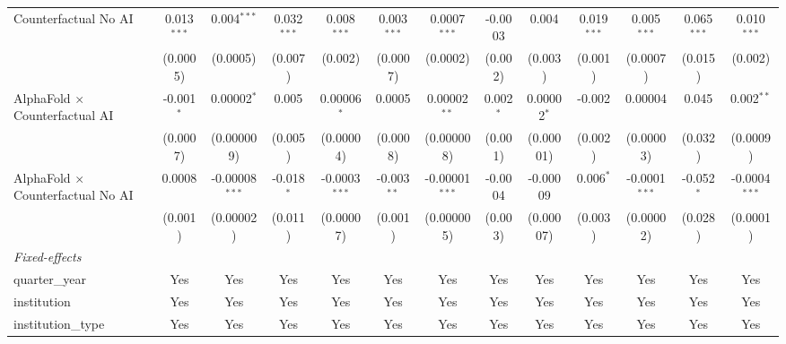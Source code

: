\begin{tabular}{lcccccccccccc}
   Counterfactual No AI                     & 0.013$^{***}$  & 0.004$^{***}$    & 0.032$^{***}$  & 0.008$^{***}$   & 0.003$^{***}$  & 0.0007$^{***}$   & -0.0003        & 0.004          & 0.019$^{***}$ & 0.005$^{***}$   & 0.065$^{***}$  & 0.010$^{***}$\\   
                                            & (0.0005)       & (0.0005)         & (0.007)        & (0.002)         & (0.0007)       & (0.0002)         & (0.002)        & (0.003)        & (0.001)       & (0.0007)        & (0.015)        & (0.002)\\   
   AlphaFold $\times$ Counterfactual AI     & -0.001$^{*}$   & 0.00002$^{*}$    & 0.005          & 0.00006$^{*}$   & 0.0005         & 0.00002$^{**}$   & 0.002$^{*}$    & 0.00002$^{*}$  & -0.002        & 0.00004         & 0.045          & 0.002$^{**}$\\   
                                            & (0.0007)       & (0.000009)       & (0.005)        & (0.00004)       & (0.0008)       & (0.000008)       & (0.001)        & (0.00001)      & (0.002)       & (0.00003)       & (0.032)        & (0.0009)\\   
   AlphaFold $\times$ Counterfactual No AI  & 0.0008         & -0.00008$^{***}$ & -0.018$^{*}$   & -0.0003$^{***}$ & -0.003$^{**}$  & -0.00001$^{***}$ & -0.0004        & -0.00009       & 0.006$^{*}$   & -0.0001$^{***}$ & -0.052$^{*}$   & -0.0004$^{***}$\\   
                                            & (0.001)        & (0.00002)        & (0.011)        & (0.00007)       & (0.001)        & (0.000005)       & (0.003)        & (0.00007)      & (0.003)       & (0.00002)       & (0.028)        & (0.0001)\\   
   \midrule
   \emph{Fixed-effects}\\
   quarter\_year                            & Yes            & Yes              & Yes            & Yes             & Yes            & Yes              & Yes            & Yes            & Yes           & Yes             & Yes            & Yes\\  
   institution                              & Yes            & Yes              & Yes            & Yes             & Yes            & Yes              & Yes            & Yes            & Yes           & Yes             & Yes            & Yes\\  
   institution\_type                        & Yes            & Yes              & Yes            & Yes             & Yes            & Yes              & Yes            & Yes            & Yes           & Yes             & Yes            & Yes\\  

\end{tabular}
